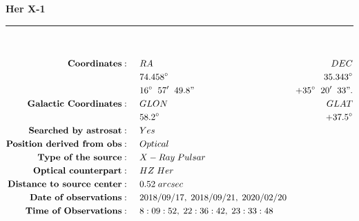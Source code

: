 \documentclass[12pt, A4]{article}
\begin{document}
    \begin{titlepage}
    \begin{center}
        \vspace*{4.5cm}
        \textbf{\huge Her X-1}\\
    \end{center}
    \rule{\textwidth}{0.8pt}\\[5pt]
    \begin{normalsize}
    \begin{align*}
        \textbf{Coordinates}:\hspace{0.5cm} &RA &DEC\\
        & 74.458\degree  &35.343\degree \\
        & 16\degree\hspace{0.2cm}57'\hspace{0.2cm}49.8"       &+35\degree\hspace{0.2cm}20'\hspace{0.2cm}33".\\
        \textbf{Galactic Coordinates}:\hspace{0.5cm} &GLON &GLAT\\
        & 58.2\degree   &+37.5\degree \\
        \textbf{Searched by astrosat}:\hspace{0.5cm} &Yes\\
        \textbf{Position derived from obs}: \hspace{0.5cm} &Optical\\
        \textbf{Type of the source}:\hspace{0.5cm} &X-Ray\hspace{0.1cm}  Pulsar\\
        \textbf{Optical counterpart}:\hspace{0.5cm} &HZ\hspace{0.1cm}Her\\
        \textbf{Distance to source center}:\hspace{0.5cm} &0.52\hspace{0.1cm}arcsec\\
        \textbf{Date of observations}: \hspace{0.5cm} &2018/09/17,\hspace{0.1cm} 2018/09/21,\hspace{0.1cm} 2020/02/20 \\
        \textbf{Time of Observations}: \hspace{0.5cm} &8:09:52,\hspace{0.1cm} 22:36:42,\hspace{0.1cm} 23:33:48\\

\end{align*}
\end{normalsize}
\end{titlepage}
\end{document}
